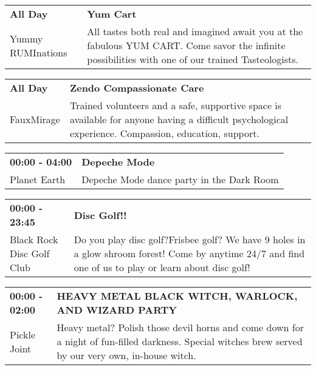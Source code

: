 \begin{tabular}{ p{1in} p{2.2in} }
    \textbf{All Day} & \textbf{Yum Cart} \\
    Yummy RUMInations \newline  & All tastes both real and imagined await you at the fabulous YUM CART. Come savor the infinite possibilities with one of our trained Tasteologists. \\
    \hline 
\end{tabular}
    
\begin{tabular}{ p{1in} p{2.2in} }
    \textbf{All Day} & \textbf{Zendo Compassionate Care } \\
    FauxMirage \newline  & Trained volunteers and a safe, supportive space is available for anyone having a difficult psychological experience. Compassion, education, support. \\
    \hline 
\end{tabular}
    
\begin{tabular}{ p{1in} p{2.2in} }
    \textbf{00:00 - 04:00} & \textbf{Depeche Mode} \\
    Planet Earth \newline  & Depeche Mode dance party in the Dark Room \\
    \hline 
\end{tabular}
    
\begin{tabular}{ p{1in} p{2.2in} }
    \textbf{00:00 - 23:45} & \textbf{Disc Golf!!} \\
    Black Rock Disc Golf Club \newline  & Do you play disc golf?Frisbee golf? We have 9 holes in a glow shroom forest! Come by anytime 24/7 and find one of us to play or learn about disc golf! \\
    \hline 
\end{tabular}
    
\begin{tabular}{ p{1in} p{2.2in} }
    \textbf{00:00 - 02:00} & \textbf{HEAVY METAL BLACK WITCH, WARLOCK, AND WIZARD PARTY} \\
    Pickle Joint \newline  & Heavy metal? Polish those devil horns and come down for a night of fun-filled darkness.  Special witches brew served by our very own, in-house witch. \\
    \hline 
\end{tabular}
    
